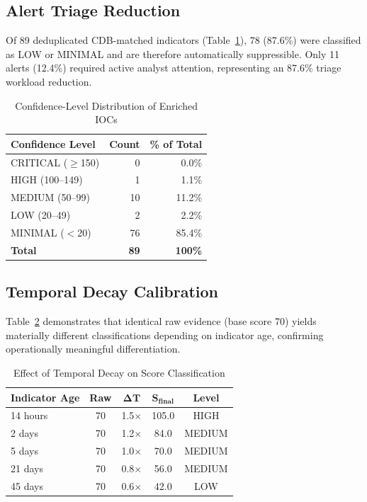 \documentclass[conference]{IEEEtran}
\begin{document}
\subsection{Alert Triage Reduction}
Of 89 deduplicated CDB-matched indicators (Table~\ref{tab:triage}), 78 (87.6\%) were classified as LOW or MINIMAL and are therefore automatically suppressible. Only 11 alerts (12.4\%) required active analyst attention, representing an 87.6\% triage workload reduction.

\begin{table}[h]
\caption{Confidence-Level Distribution of Enriched IOCs}
\centering
\begin{tabular}{lrr}
\toprule
\textbf{Confidence Level} & \textbf{Count} & \textbf{\% of Total} \\
\midrule
CRITICAL ($\geq$150) & 0 & 0.0\% \\
HIGH (100--149) & 1 & 1.1\% \\
MEDIUM (50--99) & 10 & 11.2\% \\
LOW (20--49) & 2 & 2.2\% \\
MINIMAL ($<$20) & 76 & 85.4\% \\
\midrule
\textbf{Total} & \textbf{89} & \textbf{100\%} \\
\bottomrule
\end{tabular}
\label{tab:triage}
\end{table}

\subsection{Temporal Decay Calibration}
Table~\ref{tab:decay} demonstrates that identical raw evidence (base score 70) yields materially different classifications depending on indicator age, confirming operationally meaningful differentiation.

\begin{table}[h]
\caption{Effect of Temporal Decay on Score Classification}
\centering
\begin{tabular}{lcccc}
\toprule
\textbf{Indicator Age} & \textbf{Raw} & $\boldsymbol{\Delta T}$ & $\boldsymbol{S_{final}}$ & \textbf{Level} \\
\midrule
14 hours & 70 & 1.5$\times$ & 105.0 & HIGH \\
2 days & 70 & 1.2$\times$ & 84.0 & MEDIUM \\
5 days & 70 & 1.0$\times$ & 70.0 & MEDIUM \\
21 days & 70 & 0.8$\times$ & 56.0 & MEDIUM \\
45 days & 70 & 0.6$\times$ & 42.0 & LOW \\
\bottomrule
\end{tabular}
\label{tab:decay}
\end{table}
\end{document}
